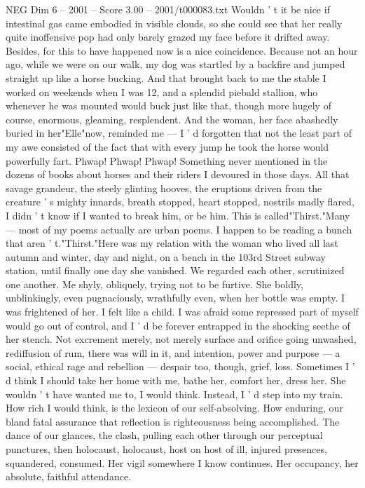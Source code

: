 \begin{textsample}{NEG Dim 6 – 2001 – Score 3.00 – 2001/t000083.txt}
Wouldn ' t it be nice if intestinal gas came embodied in visible clouds, so she could see that her really quite inoffensive pop had only barely grazed my face before it drifted away.
Besides, for this to have happened now is a nice coincidence.
Because not an hour ago, while we were on our walk, my dog was startled by a backfire and jumped straight up like a horse bucking.
And that brought back to me the stable I worked on weekends when I was 12, and a splendid piebald stallion, who whenever he was mounted would buck just like that, though more hugely of course, enormous, gleaming, resplendent.
And the woman, her face abashedly buried in her"Elle"now, reminded me — I ' d forgotten that not the least part of my awe consisted of the fact that with every jump he took the horse would powerfully fart.
Phwap!
Phwap!
Phwap!
Something never mentioned in the dozens of books about horses and their riders I devoured in those days.
All that savage grandeur, the steely glinting hooves, the eruptions driven from the creature ' s mighty innards, breath stopped, heart stopped, nostrils madly flared, I didn ' t know if I wanted to break him, or be him.
This is called"Thirst."Many — most of my poems actually are urban poems.
I happen to be reading a bunch that aren ' t."Thirst."Here was my relation with the woman who lived all last autumn and winter, day and night, on a bench in the 103rd Street subway station, until finally one day she vanished.
We regarded each other, scrutinized one another.
Me shyly, obliquely, trying not to be furtive.
She boldly, unblinkingly, even pugnaciously, wrathfully even, when her bottle was empty.
I was frightened of her.
I felt like a child.
I was afraid some repressed part of myself would go out of control, and I ' d be forever entrapped in the shocking seethe of her stench.
Not excrement merely, not merely surface and orifice going unwashed, rediffusion of rum, there was will in it, and intention, power and purpose — a social, ethical rage and rebellion — despair too, though, grief, loss.
Sometimes I ' d think I should take her home with me, bathe her, comfort her, dress her.
She wouldn ' t have wanted me to, I would think.
Instead, I ' d step into my train.
How rich I would think, is the lexicon of our self-absolving.
How enduring, our bland fatal assurance that reflection is righteousness being accomplished.
The dance of our glances, the clash, pulling each other through our perceptual punctures, then holocaust, holocaust, host on host of ill, injured presences, squandered, consumed.
Her vigil somewhere I know continues.
Her occupancy, her absolute, faithful attendance.

\end{textsample}
